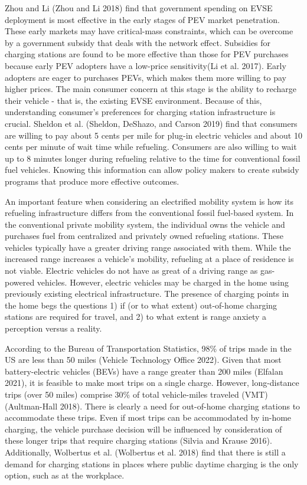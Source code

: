 \documentclass[
  letterpaper,
  DIV=11,
  numbers=noendperiod]{scrartcl}
\begin{document}
Zhou and Li (Zhou and Li 2018) find that government spending on EVSE
deployment is most effective in the early stages of PEV market
penetration. These early markets may have critical-mass constraints,
which can be overcome by a government subsidy that deals with the
network effect. Subsidies for charging stations are found to be more
effective than those for PEV purchases because early PEV adopters have a
low-price sensitivity(Li et al. 2017). Early adopters are eager to
purchases PEVs, which makes them more willing to pay higher prices. The
main consumer concern at this stage is the ability to recharge their
vehicle - that is, the existing EVSE environment. Because of this,
understanding consumer's preferences for charging station infrastructure
is crucial. Sheldon et al. (Sheldon, DeShazo, and Carson 2019) find that
consumers are willing to pay about 5 cents per mile for plug-in electric
vehicles and about 10 cents per minute of wait time while refueling.
Consumers are also willing to wait up to 8 minutes longer during
refueling relative to the time for conventional fossil fuel vehicles.
Knowing this information can allow policy makers to create subsidy
programs that produce more effective outcomes.

An important feature when considering an electrified mobility system is
how its refueling infrastructure differs from the conventional fossil
fuel-based system. In the conventional private mobility system, the
individual owns the vehicle and purchases fuel from centralized and
privately owned refueling stations. These vehicles typically have a
greater driving range associated with them. While the increased range
increases a vehicle's mobility, refueling at a place of residence is not
viable. Electric vehicles do not have as great of a driving range as
gas-powered vehicles. However, electric vehicles may be charged in the
home using previously existing electrical infrastructure. The presence
of charging points in the home begs the questions 1) if (or to what
extent) out-of-home charging stations are required for travel, and 2) to
what extent is range anxiety a perception versus a reality.

According to the Bureau of Transportation Statistics, 98\% of trips made
in the US are less than 50 miles (Vehicle Technology Office 2022). Given
that most battery-electric vehicles (BEVs) have a range greater than 200
miles (Elfalan 2021), it is feasible to make most trips on a single
charge. However, long-distance trips (over 50 miles) comprise 30\% of
total vehicle-miles traveled (VMT) (Aultman-Hall 2018). There is clearly
a need for out-of-home charging stations to accommodate these trips.
Even if most trips can be accommodated by in-home charging, the vehicle
purchase decision will be influenced by consideration of these longer
trips that require charging stations (Silvia and Krause 2016).
Additionally, Wolbertus et al. (Wolbertus et al. 2018) find that there
is still a demand for charging stations in places where public daytime
charging is the only option, such as at the workplace.
\end{document}
